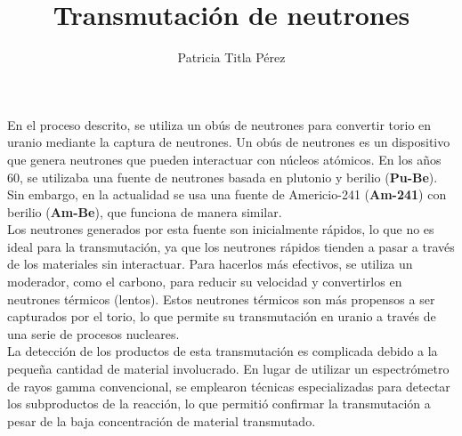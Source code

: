 \documentclass{article}
\title{Transmutación de neutrones}
\author{Patricia Titla Pérez}
\theoremstyle{mytheoremstyle}
\theoremstyle{mytheoremstyle}
\theoremstyle{myproblemstyle}
\begin{document}
\maketitle

{En el proceso descrito, se utiliza un obús de neutrones para convertir torio en uranio mediante la captura de neutrones. Un obús de neutrones es un dispositivo que genera neutrones que pueden interactuar con núcleos atómicos. En los años 60, se utilizaba una fuente de neutrones basada en plutonio y berilio (\textbf{Pu-Be}). Sin embargo, en la actualidad se usa una fuente de Americio-241 (\textbf{Am-241}) con berilio (\textbf{Am-Be}), que funciona de manera similar. \\ 
Los neutrones generados por esta fuente son inicialmente rápidos, lo que no es ideal para la transmutación, ya que los neutrones rápidos tienden a pasar a través de los materiales sin interactuar. Para hacerlos más efectivos, se utiliza un moderador, como el carbono, para reducir su velocidad y convertirlos en neutrones térmicos (lentos). Estos neutrones térmicos son más propensos a ser capturados por el torio, lo que permite su transmutación en uranio a través de una serie de procesos nucleares. \\ 
La detección de los productos de esta transmutación es complicada debido a la pequeña cantidad de material involucrado. En lugar de utilizar un espectrómetro de rayos gamma convencional, se emplearon técnicas especializadas para detectar los subproductos de la reacción, lo que permitió confirmar la transmutación a pesar de la baja concentración de material transmutado.}
\end{document}
